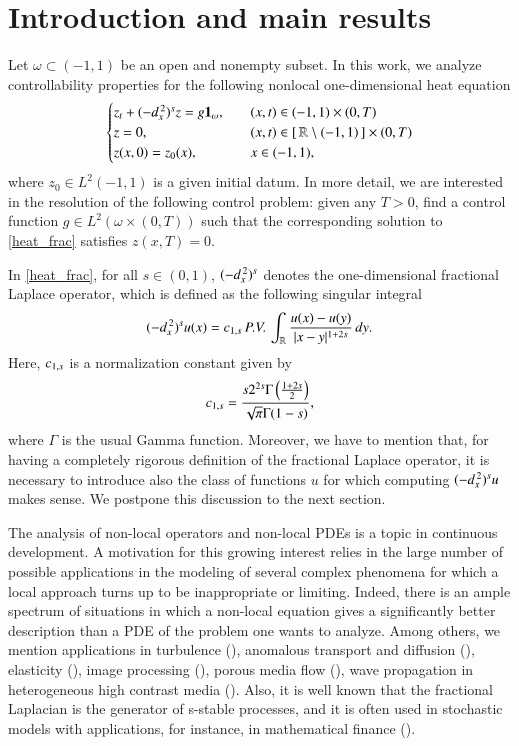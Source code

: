 \section{Introduction and main results}\label{intro_sec}
Let $\omega\subset (-1,1)$ be an open and nonempty subset. In this work, we analyze controllability properties for the following nonlocal one-dimensional heat equation 
\begin{align}\label{heat_frac}
	\begin{cases}
		z_t + (-d_x^{\,2})^{s}z = g\mathbf{1}_{\omega},\quad & (x,t)\in (-1,1)\times(0,T)
		\\
		z=0, & (x,t)\in[\,\mathbb{R}\setminus (-1,1)\,]\times(0,T)
		\\
		z(x,0)=z_0(x), & x\in (-1,1),
	\end{cases}
\end{align} 
where $z_0\in L^2(-1,1)$ is a given initial datum. In more detail, we are interested in the resolution of the following control problem: given any $T>0$, find a control function $g\in L^2(\omega\times(0,T))$ such that the corresponding solution to \eqref{heat_frac} satisfies $z(x,T)=0$. 

In \eqref{heat_frac}, for all $s\in(0,1)$, $(-d_x^{\,2})^{s}$ denotes the one-dimensional fractional Laplace operator, which is defined as the following singular integral
\begin{align}\label{fl_intro}
	(-d_x^{\,2})^{s}u(x) = c_{1,s}\,P.V.\,\int_{\mathbb{R}}\frac{u(x)-u(y)}{|x-y|^{1+2s}}\,dy. 
\end{align}
Here, $c_{1,s}$ is a normalization constant given by
\begin{align*}
	c_{1,s} = \frac{s2^{2s}\Gamma\left(\frac{1+2s}{2}\right)}{\sqrt{\pi}\Gamma(1-s)},
\end{align*}
where $\Gamma$ is the usual Gamma function. Moreover, we have to mention that, for having a completely rigorous definition of the fractional Laplace operator, it is necessary to introduce also the class of functions $u$ for which computing $(-d_x^{\,2})^{s}u$ makes sense. We postpone this discussion to the next section.

The analysis of non-local operators and non-local PDEs is a topic in continuous development.
A motivation for this growing interest relies in the large number of possible applications in the modeling of several complex phenomena for which a local approach turns up to be inappropriate or limiting.
Indeed, there is an ample spectrum of situations in which a non-local equation gives a
significantly better description than a PDE of the problem one wants to analyze.
Among others, we mention applications in turbulence (\cite{bakunin2008turbulence}), anomalous transport and diffusion (\cite{bologna2000anomalous,meerschaert2012fractional}), elasticity (\cite{dipierro2015dislocation}), image processing (\cite{gilboa2008nonlocal}), porous media flow (\cite{vazquez2012nonlinear}), wave propagation in heterogeneous high contrast media (\cite{zhu2014modeling}). Also, it is well known that the fractional Laplacian is the generator of s-stable processes, and it is often used in stochastic models with applications, for instance, in mathematical finance (\cite{levendorskii2004pricing,pham1997optimal}).

